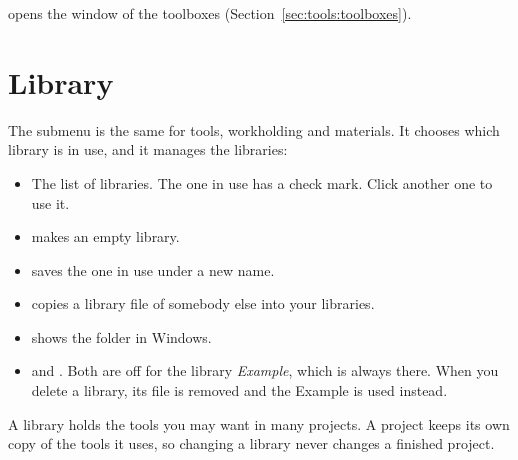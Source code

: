  opens the window of the toolboxes (Section~\ref{sec:tools:toolboxes}).

\section{Library}\label{sec:tools_menu:library}
The  submenu is the same for tools, workholding and materials. It chooses which library is in use, and it manages the libraries:
\begin{itemize}
  \item The list of libraries. The one in use has a check mark. Click another one to use it.
  \item {} makes an empty library.
  \item {} saves the one in use under a new name.
  \item {} copies a library file of somebody else into your libraries.
  \item {} shows the folder in Windows.
  \item {} and . Both are off for the library \emph{Example}, which is always there. When you delete a library, its file is removed and the Example is used instead.
\end{itemize}
A library holds the tools you may want in many projects. A project keeps its own copy of the tools it uses, so changing a library never changes a finished project.

